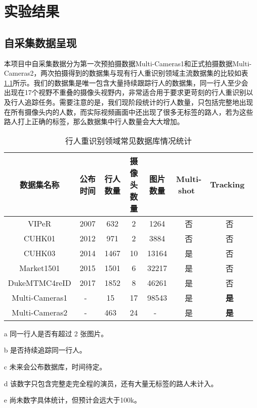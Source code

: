 \chapter{实验结果}\label{sec:experiment}

\section{自采集数据呈现}

本项目中自采集数据分为第一次预拍摄数据Multi-Cameras1和正式拍摄数据Multi-Cameras2，两次拍摄得到的数据集与现有行人重识别领域主流数据集的比较如表\ref{tab:reiddataset}所示。我们的数据集是唯一包含大量持续跟踪行人的数据集，同一行人至少会出现在17个视野不重叠的摄像头视野内，非常适合用于要求更苛刻的行人重识别以及行人追踪任务。需要注意的是，我们现阶段统计的行人数量，只包括完整地出现在所有摄像头内的人数，而实际视频画面中还出现了很多无标签的路人，若为这些路人打上正确的标签，那么数据集中行人数量会大大增加。

\begin{table}[!htb]
\centering
\caption{行人重识别领域常见数据库情况统计}
\label{tab:reiddataset}
\begin{threeparttable}
\begin{tabularx}{\textwidth}{ccccccc}
\toprule
数据集名称   & 公布时间 & 行人数量 & 摄像头数量 & 图片数量  & Multi-shot~\tnote{a} & Tracking~\tnote{b} \\ \midrule
VIPeR\cite{gray2007evaluating}  & 2007 & 632  & 2     & 1264  & 否  & 否 \\
CUHK01\cite{li2012human} & 2012 & 971  & 2     & 3884  & 否  & 否 \\
CUHK03\cite{li2014deepreid} & 2014 & 1467 & 10    & 13164 & 是  & 否 \\
Market1501\cite{zheng2015scalable} & 2015 & 1501 & 6     & 32217 & 是  & 否 \\
DukeMTMC4reID\cite{gou2017dukemtmc4reid}  & 2017 & 1852 & 8     & 46261 & 是  & 否 \\
Multi-Cameras1 &  -~\tnote{c}   & 15~\tnote{d}   & 17     & 98543 & 是  & \textbf{是} \\
Multi-Cameras2 &  -~\tnote{c}   & 463~\tnote{d} & 24     & -~\tnote{e} & 是  & \textbf{是} \\
\bottomrule
\end{tabularx}
\begin{tablenotes}
    \footnotesize
    \item[a] 同一行人是否有超过 2 张图片。
    \item[b] 是否持续追踪同一行人。
    \item[c] 未来会公布数据库，时间待定。
    \item[d] 该数字只包含完整走完全程的演员，还有大量无标签的路人未计入。
    \item[e] 尚未数字具体统计，但预计会远大于100k。
\end{tablenotes}
\end{threeparttable}
\end{table}


